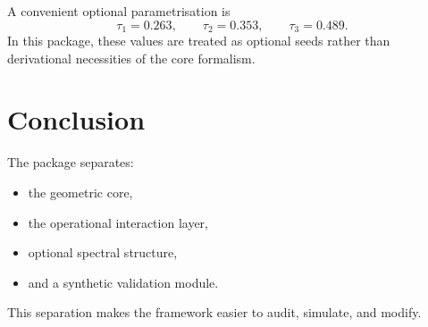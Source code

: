 \documentclass[12pt,a4paper]{article}
\begin{document}
A convenient optional parametrisation is
\[
\tau_1=0.263,\qquad \tau_2=0.353,\qquad \tau_3=0.489.
\]
In this package, these values are treated as optional seeds rather than derivational necessities of the core formalism.

\section{Conclusion}

The package separates:
\begin{itemize}
\item the geometric core,
\item the operational interaction layer,
\item optional spectral structure,
\item and a synthetic validation module.
\end{itemize}

This separation makes the framework easier to audit, simulate, and modify.



\end{document}
